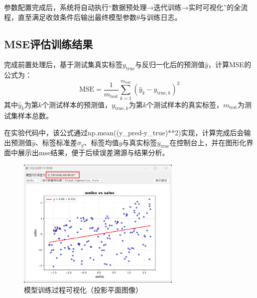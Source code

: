 参数配置完成后，系统将自动执行“数据预处理→迭代训练→实时可视化”的全流程，直至满足收敛条件后输出最终模型参数$\theta$与训练日志。

\subsection{MSE评估训练结果}
完成前置处理后，基于测试集真实标签$y_{\text{true}}$与反归一化后的预测值$\hat{y}$，计算MSE的公式为：
\[
\text{MSE} = \frac{1}{m_{\text{test}}} \sum_{k=1}^{m_{\text{test}}} \left( \hat{y}_k - y_{\text{true},k} \right)^2
\]
其中$\hat{y}_k$为第$k$个测试样本的预测值，$y_{\text{true},k}$为第$k$个测试样本的真实标签，$m_{\text{test}}$为测试集样本总数。

在实验代码中，该公式通过np.mean((y\_pred-y\_true)**2)实现，计算完成后会输出预测值$\hat{y}$、标签标准差$\sigma_y$、标签均值$\overline{y}$与真实标签$y_{\text{true}}$在控制台上，并在图形化界面中展示出mse结果，便于后续误差溯源与结果分析。

\begin{figure}[!htb]
    \centering
    \includegraphics[width=0.70\textwidth]{./figures/mse.png}
    \caption{模型训练过程可视化（投影平面图像）}
    \label{fig:mse_process} %
\end{figure}